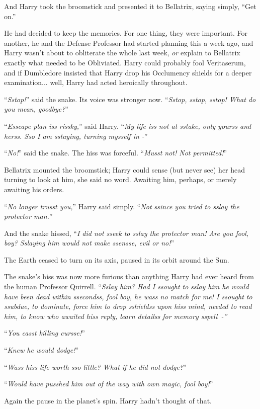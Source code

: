 And Harry took the broomstick and presented it to Bellatrix, saying simply, ``Get on.''

He had decided to keep the memories. For one thing, they were important. For another, he and the Defense Professor had started planning this a week ago, and Harry wasn't about to obliterate the whole last week, \emph{or} explain to Bellatrix exactly what needed to be Obliviated. Harry could probably fool Veritaserum, and if Dumbledore insisted that Harry drop his Occlumency shields for a deeper examination... well, Harry had acted heroically throughout.

``\emph{Sstop!}'' said the snake. Its voice was stronger now. ``\emph{Sstop, sstop, sstop! What do you mean, goodbye?}''

``\emph{Esscape plan iss rissky,}'' said Harry. ``\emph{My life iss not at sstake, only yourss and herss. Sso I am sstaying, turning mysself in -}''

``\emph{No!}'' said the snake. The hiss was forceful. ``\emph{Musst not! Not permitted!}''

Bellatrix mounted the broomstick; Harry could sense (but never see) her head turning to look at him, she said no word. Awaiting him, perhaps, or merely awaiting his orders.

``\emph{No longer trusst you,}'' Harry said simply. ``\emph{Not ssince you tried to sslay the protector man.}''

And the snake hissed, ``\emph{I did not sseek to sslay the protector man! Are you fool, boy? Sslaying him would not make ssensse, evil or no!}''

The Earth ceased to turn on its axis, paused in its orbit around the Sun.

The snake's hiss was now more furious than anything Harry had ever heard from the human Professor Quirrell. ``\emph{Sslay him? Had I ssought to sslay him he would have been dead within ssecondss, fool boy, he wass no match for me! I ssought to ssubdue, to dominate, force him to drop sshieldss upon hiss mind, needed to read him, to know who awaited hiss reply, learn detailss for memory sspell~-''}

``\emph{You casst killing cursse!}''

``\emph{Knew he would dodge!}''

``\emph{Wass hiss life worth sso little? What if he did not dodge?}''

``\emph{Would have pusshed him out of the way with own magic, fool boy!}''

Again the pause in the planet's spin. Harry hadn't thought of that.

